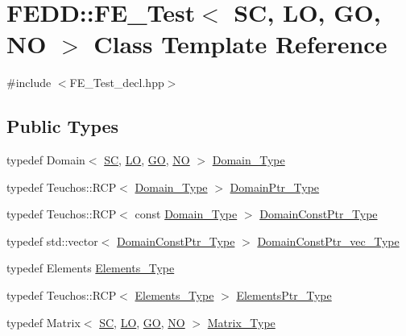 \hypertarget{classFEDD_1_1FE__Test}{}\section{F\+E\+DD\+:\+:F\+E\+\_\+\+Test$<$ SC, LO, GO, NO $>$ Class Template Reference}
\label{classFEDD_1_1FE__Test}


{\ttfamily \#include $<$F\+E\+\_\+\+Test\+\_\+decl.\+hpp$>$}

\subsection*{Public Types}
\begin{DoxyCompactItemize}
\item 
typedef Domain$<$ \hyperlink{fe__test__laplace_8cpp_a79c7e86a57edbb2a5a53242bcd04e41e}{SC}, \hyperlink{fe__test__laplace_8cpp_ad6a38c9f07d3fd633eefca5bccad8410}{LO}, \hyperlink{fe__test__laplace_8cpp_afa2946b509009b4f45eb04bd8c5b27d9}{GO}, \hyperlink{fe__test__laplace_8cpp_a5e24f37b28787429872b6ecb1d0417ce}{NO} $>$ \hyperlink{classFEDD_1_1FE__Test_a5e414af507a141db0961c32bf6b19825}{Domain\+\_\+\+Type}
\item 
typedef Teuchos\+::\+R\+CP$<$ \hyperlink{classFEDD_1_1FE__Test_a5e414af507a141db0961c32bf6b19825}{Domain\+\_\+\+Type} $>$ \hyperlink{classFEDD_1_1FE__Test_a1020475c408a64c7926feb8dded7f0c3}{Domain\+Ptr\+\_\+\+Type}
\item 
typedef Teuchos\+::\+R\+CP$<$ const \hyperlink{classFEDD_1_1FE__Test_a5e414af507a141db0961c32bf6b19825}{Domain\+\_\+\+Type} $>$ \hyperlink{classFEDD_1_1FE__Test_a0a941851908a1e68d1554f8b28a7c72a}{Domain\+Const\+Ptr\+\_\+\+Type}
\item 
typedef std\+::vector$<$ \hyperlink{classFEDD_1_1FE__Test_a0a941851908a1e68d1554f8b28a7c72a}{Domain\+Const\+Ptr\+\_\+\+Type} $>$ \hyperlink{classFEDD_1_1FE__Test_a3345ab320c9e19d77dc7fec9645da0d0}{Domain\+Const\+Ptr\+\_\+vec\+\_\+\+Type}
\item 
typedef Elements \hyperlink{classFEDD_1_1FE__Test_a73f1a4ecb41cbeec1be473d71efe022d}{Elements\+\_\+\+Type}
\item 
typedef Teuchos\+::\+R\+CP$<$ \hyperlink{classFEDD_1_1FE__Test_a73f1a4ecb41cbeec1be473d71efe022d}{Elements\+\_\+\+Type} $>$ \hyperlink{classFEDD_1_1FE__Test_af8f5bc3cb82c5d60a3a63b1e5c89a678}{Elements\+Ptr\+\_\+\+Type}
\item 
typedef Matrix$<$ \hyperlink{fe__test__laplace_8cpp_a79c7e86a57edbb2a5a53242bcd04e41e}{SC}, \hyperlink{fe__test__laplace_8cpp_ad6a38c9f07d3fd633eefca5bccad8410}{LO}, \hyperlink{fe__test__laplace_8cpp_afa2946b509009b4f45eb04bd8c5b27d9}{GO}, \hyperlink{fe__test__laplace_8cpp_a5e24f37b28787429872b6ecb1d0417ce}{NO} $>$ \hyperlink{classFEDD_1_1FE__Test_ab21a3d554ec8bf6763a7dabcbe800b35}{Matrix\+\_\+\+Type}

\end{DoxyCompactItemize}
